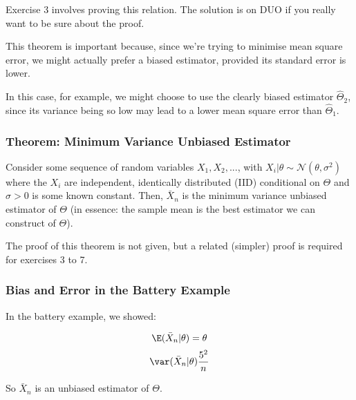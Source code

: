 \documentclass[a4paper]{article}
\begin{document}
                \begin{relq}
                    Exercise 3 involves proving this relation. The solution is
                    on DUO if you really want to be sure about the proof.
                \end{relq}

                This theorem is important because, since we're trying to
                minimise mean square error, we might actually prefer a biased
                estimator, provided its standard error is lower.


                In this case, for example, we might choose to use the clearly
                biased estimator $\hat\Theta_2$, since its variance being so
                low may lead to a lower mean square error than $\hat\Theta_1$.

            \subsubsection{Theorem: Minimum Variance Unbiased Estimator}
                Consider some sequence of random variables $X_1, X_2, ...$, with
                $X_i | \theta \sim \mathcal{N}(\theta, \sigma^2)$ where the
                $X_i$ are independent, identically distributed (IID) conditional
                on $\Theta$ and $\sigma > 0$ is some known constant. Then,
                $\bar X_n$ is the minimum variance unbiased estimator of
                $\Theta$ (in essence: the sample mean is the best estimator we
                can construct of $\Theta$).

                \begin{relq}
                    The proof of this theorem is not given, but a related
                    (simpler) proof is required for exercises 3 to 7.
                \end{relq}

            \subsubsection{Bias and Error in the Battery Example}
                In the battery example, we showed:

                \[
                    \E(\bar X_n | \theta) = \theta
                \]
                \[
                    \var(\bar X_n | \theta) \frac{5^2}{n}
                \]

                So $\bar X_n$ is an unbiased estimator of $\Theta$.
\end{document}
